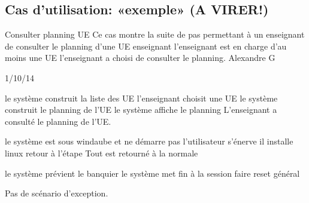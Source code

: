 \subsection{Cas d'utilisation: «exemple» (A VIRER!)}

\startCU
\nom Consulter planning UE
\but Ce cas montre la suite de pas permettant à un enseignant de consulter le planning d'une UE
\acteur enseignant
\precondition l'enseignant est en charge d'au moins une UE
\declenchement l'enseignant a choisi de consulter le planning.
\auteur Alexandre G
\date 21/10/14

\nominal %
\startnominal
\etape[SA1] le système construit la liste des UE
\etape[RETOUR] l'enseignant choisit une UE
\etape le système construit le planning de l'UE
\etape[SA2] le système affiche le planning
\stopnominal
\postcondition L'enseignant a consulté le planning de l'UE.

\alternatifs %
\startalternatif[SA1] %
  \etape le système est sous windaube et ne démarre pas
  \etape l'utilisateur s'énerve
  \etape il installe linux
  \etape retour à l'étape \in[RETOUR]
\stopcondition
\postcondition Tout est retourné à la normale
\stopalternatif

\startalternatif[SA2]
  \etape le système prévient le banquier
  \etape le système met fin à la session
\stopcondition
{}
  \etape faire reset général
\stopcondition
\stopalternatif

\exception %
Pas de scénario d'exception.
\stopCU
